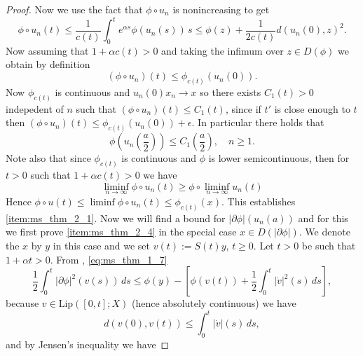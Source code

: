 \documentclass[a4paper,11pt, leqno]{scrreprt} %
\renewcommand{\leq}{\leqslant}
\renewcommand{\leq}{\leqslant}
\renewcommand{\geq}{\geqslant}
\theoremstyle{change}
\theoremstyle{nonumberplain}
\newtheorem{proof}{Proof}
\begin{document}
\begin{proof}
  Now we use the fact that $\phi \circ u_n$ is nonincreasing to get
  \begin{equation}
    \label{eq:ms_thm_2_24}
    \phi \circ u_n(t) \leq \frac{1}{c(t)} \int_0^t e^{\alpha s}
    \phi(u_n(s)) \, s \leq \phi(z) + \frac{1}{2c(t)} d(u_n(0), z)^2.
  \end{equation}
  Now assuming that $1 + \alpha c(t) > 0$ and taking the infimum over
  $z \in D(\phi)$ we obtain by definition
  \begin{equation}
    \label{eq:ms_thm_2_25}
    (\phi \circ u_n)(t) \leq \phi_{c(t)}(u_n(0)).
  \end{equation}
  Now $\phi_{c(t)}$ is continuous and $u_n(0)  x_n \to x$ so there
  exists $C_1(t) > 0$ indepedent of $n$ such that $(\phi \circ u_n)(t)
  \leq C_1(t)$, since if $t'$ is close enough to $t$ then $(\phi \circ
  u_n)(t) \leq \phi_{c(t)}(u_n(0)) + \epsilon$. In particular there
  holds that
  \begin{equation}
    \label{eq:ms_thm_2_26}
    \phi \left (u_n \left ( \frac{a}{2} \right ) \right ) \leq C_1
    \left ( \frac{a}{2} \right ), \quad n \geq 1.
  \end{equation}
  Note also that since $\phi_{c(t)}$ is continuous and $\phi$ is lower
  semicontinuous, then for $t > 0$ such that $1 + \alpha c(t) > 0$ we
  have
  \begin{equation}
    \label{eq:ms_thm_2_27}
    \liminf_{n \to \infty} \phi \circ u_n(t) \geq \phi \circ
    \liminf_{n \to \infty} u_n(t)
  \end{equation}
  Hence $\phi \circ u(t) \leq \liminf \phi \circ u_n(t) \leq
  \phi_{c(t)}(x)$. This establishes \ref{item:ms_thm_2_1}. Now we will
  find a bound for $|\partial \phi|(u_n(a))$ and for this we first
  prove \ref{item:ms_thm_2_4} in the special case $x \in D(|\partial
  \phi|)$. We denote the $x$ by $y$ in this case and we set $v(t) :=
  S(t)y$, $t \geq 0$. Let $t > 0$ be such that $1 + \alpha t >
  0$. From , \eqref{eq:ms_thm_1_7}
  \begin{equation}
    \label{eq:ms_thm_2_28}
    \frac12 \int_0^t |\partial \phi|^2(v(s)) \, ds \leq \phi(y) -
    \left [ \phi(v(t)) + \frac12 \int_0^t |\dot v|^2(s) \, ds \right ],
  \end{equation}
  because $v \in \text{Lip}([0, t]; X)$ (hence absolutely continuous) we have
  \begin{equation}
    \label{eq:ms_thm_2_29}
    d(v(0), v(t)) \leq \int_0^t |\dot v|(s) \, ds,
  \end{equation}
  and by Jensen's inequality we have

\end{proof}
\end{document}
